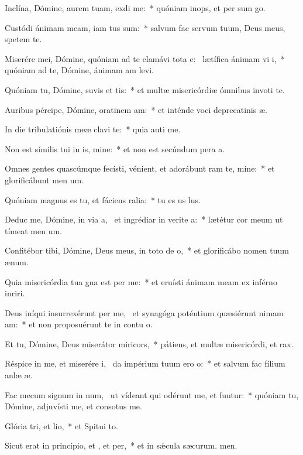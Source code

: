 \item Inclína, Dómine, aurem tuam,  exdi me:~* quóniam inops, et per sum go.
\item Custódi ánimam meam, iam tus sum:~* salvum fac servum tuum, Deus meus, spetem  te.
\item Miserére mei, Dómine, quóniam ad te clamávi tota e:~\pscross{} lætífica ánimam vi i,~* quóniam ad te, Dómine, ánimam am levi.
\item Quóniam tu, Dómine, suvis et tis:~* et multæ misericórdiæ ómnibus invoti te.
\item Auribus pércipe, Dómine, oratinem am:~* et inténde voci deprecatinis æ.
\item In die tribulatiónis meæ clavi  te:~* quia auti me.
\item Non est símilis tui in is, mine:~* et non est secúndum pera a.
\item Omnes gentes quascúmque fecísti, vénient, et adorábunt ram te, mine:~* et glorificábunt men um.
\item Quóniam magnus es tu, et fáciens ralia:~* tu es us lus.
\item Deduc me, Dómine, in via a,~\pscross{} et ingrédiar in verite a:~* lætétur cor meum ut tímeat men um.
\item Confitébor tibi, Dómine, Deus meus, in toto de o,~* et glorificábo nomen tuum  ænum.
\item Quia misericórdia tua gna est per me:~* et eruísti ánimam meam ex inférno inriri.
\item Deus iníqui insurrexérunt per me,~\pscross{} et synagóga poténtium quæsiérunt nimam am:~* et non proposuérunt te in contu o.
\item Et tu, Dómine, Deus miserátor  miricors,~* pátiens, et multæ misericórdi, et rax.
\item Réspice in me, et miserére i,~\pscross{} da impérium tuum ero o:~* et salvum fac fílium anlæ æ.
\item Fac mecum signum in num,~\pscross{} ut vídeant qui odérunt me, et funtur:~* quóniam tu, Dómine, adjuvísti me, et consotus  me.
\item Glória tri, et lio,~* et Spitui to.
\item Sicut erat in princípio, et , et per,~* et in sǽcula sæcurum. men.
